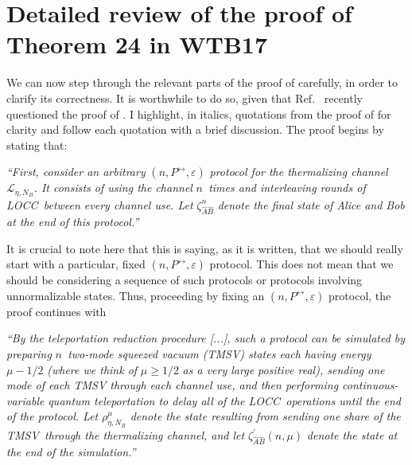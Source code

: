 \documentclass[apsrev,twocolumn]{revtex4-1}%
\begin{document}
\section{Detailed review of the proof of Theorem 24 in WTB17}

\label{sec:proof-review}

We can now step through the relevant parts of the proof of \cite[Theorem~24]%
{WTB16} carefully, in order to clarify its correctness. It is worthwhile to do so, given that Ref.~\cite{P17} recently questioned the proof of \cite[Theorem~24]%
{WTB16}. I highlight, in
italics, quotations from the proof of \cite[Theorem~24]{WTB16} for clarity and
follow each quotation with a brief discussion. The proof begins by stating that:

\textit{\textquotedblleft First, consider an arbitrary }$(n,P^{\leftrightarrow
},\varepsilon)$\textit{ protocol for the thermalizing channel }$\mathcal{L}%
_{\eta,N_{B}}$\textit{. It consists of using the channel }$n$\textit{~times
and interleaving rounds of LOCC\ between every channel use. Let }$\zeta
_{\hat{A}\hat{B}}^{n}$\textit{ denote the final state of Alice and Bob at the
end of this protocol.\textquotedblright}

It is crucial to note here that this is saying, as it is written, that we
should really start with a particular, fixed $(n,P^{\leftrightarrow
},\varepsilon)$ protocol. This does not mean that we should be considering a
sequence of such protocols
or protocols involving unnormalizable states.
Thus, proceeding by fixing an $(n,P^{\leftrightarrow},\varepsilon)$ protocol,
the proof continues with

\textit{\textquotedblleft By the teleportation reduction procedure [...], such
a protocol can be simulated by preparing }$n$\textit{\ two-mode squeezed
vacuum (TMSV) states each having energy }$\mu-1/2$\textit{ (where we think of
}$\mu\geq1/2$\textit{ as a very large positive real), sending one mode of each
TMSV through each channel use, and then performing continuous-variable quantum
teleportation \cite{prl1998braunstein} to delay all of the LOCC\ operations
until the end of the protocol. Let }$\rho_{\eta,N_{B}}^{\mu}$\textit{ denote
the state resulting from sending one share of the TMSV\ through the
thermalizing channel, and let }$\zeta_{\hat{A}\hat{B}}^{\prime}(n,\mu
)$\textit{ denote the state at the end of the simulation.\textquotedblright}
\end{document}
